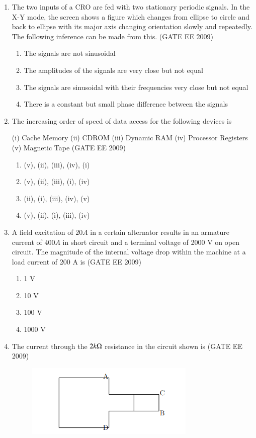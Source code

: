 \documentclass[journal,12pt,onecolumn]{IEEEtran}
\theoremstyle{remark}
\begin{document}
\begin{flushleft}
\begin{enumerate}
\item The two inputs of a CRO are fed with two stationary periodic signals. In the X-Y mode, the screen shows a figure which changes from ellipse to circle and back to ellipse with its major axis changing orientation slowly and repeatedly. The following inference can be made from this. 
\hfill(GATE EE 2009)
\begin{enumerate}
    \item  The signals are not sinusoidal 
\item  The amplitudes of the signals are very close but not equal 
\item  The signals are sinusoidal with their frequencies very close but not equal 
\item There is a constant but small phase difference between the signals
\end{enumerate}


\item The increasing order of speed of data access for the following devices is

(i) Cache Memory \quad (ii) CDROM \quad (iii) Dynamic RAM \quad (iv) Processor Registers \quad (v) Magnetic Tape 
\hfill(GATE EE 2009)
\begin{enumerate}
    \item  (v), (ii), (iii), (iv), (i) 
\item  (v), (ii), (iii), (i), (iv) 
\item  (ii), (i), (iii), (iv), (v) 
\item  (v), (ii), (i), (iii), (iv)
\end{enumerate}


\item A field excitation of $20 A$ in a certain alternator results in an armature current of $400 A$ in short circuit and a terminal voltage of 2000 V on open circuit. The magnitude of the internal voltage drop within the machine at a load current of 200 A is 
\hfill(GATE EE 2009)
\begin{enumerate}
\item  1 V 
\item  10 V 
\item 100 V 
\item 1000 V
\end{enumerate}

\item The current through the $2 k \ohm$ resistance in the circuit shown is
\hfill(GATE EE 2009)
\begin{figure}[H]
    \centering
    \includegraphics[width=0.5\columnwidth]{figs/image.png}
    \caption{}
    \label{fig:placeholder}
\end{figure}


\end{enumerate}
\end{flushleft}
\end{document}
